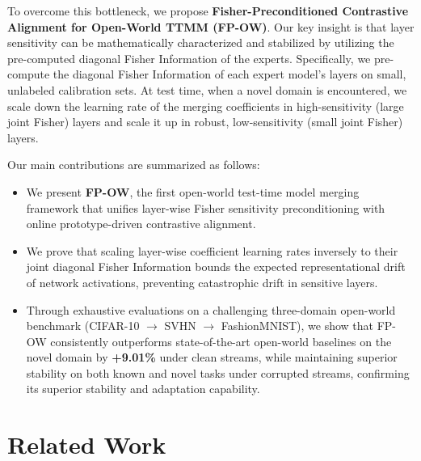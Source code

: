 \documentclass{article}
\theoremstyle{plain}
\theoremstyle{definition}
\theoremstyle{remark}
\begin{document}
To overcome this bottleneck, we propose \textbf{Fisher-Preconditioned Contrastive Alignment for Open-World TTMM (FP-OW)}. Our key insight is that layer sensitivity can be mathematically characterized and stabilized by utilizing the pre-computed diagonal Fisher Information of the experts. Specifically, we pre-compute the diagonal Fisher Information of each expert model's layers on small, unlabeled calibration sets. At test time, when a novel domain is encountered, we scale down the learning rate of the merging coefficients in high-sensitivity (large joint Fisher) layers and scale it up in robust, low-sensitivity (small joint Fisher) layers.

Our main contributions are summarized as follows:
\begin{itemize}
  \item We present \textbf{FP-OW}, the first open-world test-time model merging framework that unifies layer-wise Fisher sensitivity preconditioning with online prototype-driven contrastive alignment.
  \item We prove that scaling layer-wise coefficient learning rates inversely to their joint diagonal Fisher Information bounds the expected representational drift of network activations, preventing catastrophic drift in sensitive layers.
  \item Through exhaustive evaluations on a challenging three-domain open-world benchmark (CIFAR-10 $\rightarrow$ SVHN $\rightarrow$ FashionMNIST), we show that FP-OW consistently outperforms state-of-the-art open-world baselines on the novel domain by \textbf{+9.01\%} under clean streams, while maintaining superior stability on both known and novel tasks under corrupted streams, confirming its superior stability and adaptation capability.
\end{itemize}

\section{Related Work}
\label{related-work}
\end{document}
